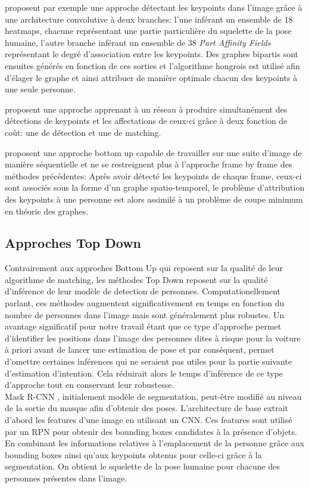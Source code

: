 \cite{cao2017realtime} proposent par exemple une approche détectant les keypoints dans l'image grâce à une architecture convolutive à deux branches: l'une inférant un ensemble de 18 heatmaps, chacune représentant une partie particulière du squelette de la pose humaine, l'autre branche inférant un ensemble de 38 \textit{Part Affinity Fields} représentant le degré d'association entre les keypoints. Des graphes bipartis sont ensuites générés en fonction de ces sorties et l'algorithme hongrois est utilisé afin d'élager le graphe et ainsi attribuer de manière optimale chacun des keypoints à une seule personne.

\cite{627f7b8a4a3441f28d400cfbd7a32b80} proposent une approche apprenant à un réseau à produire simultanément des détections de keypoints et les affectations de ceux-ci grâce à deux fonction de coût: une de détection et une de matching.

\cite{DBLP:journals/corr/InsafutdinovAPT16} proposent une approche bottom up capable de travailler sur une suite d'image de manière séquentielle et ne se restreignent plus à l'approche frame by frame des méthodes précédentes: Après avoir détecté les keypoints de chaque frame, ceux-ci sont associés sous la forme d'un graphe spatio-temporel, le problème d'attribution des keypoints à une personne est alors assimilé à un problème de coupe minimum en théorie des graphes.

\subsection{Approches Top Down}
Contrairement aux approches Bottom Up qui reposent sur la qualité de leur algorithme de matching, les méthodes Top Down reposent sur la qualité d'inférence de leur modèle de detection de personnes. Computationellement parlant, ces méthodes augmentent significativement en temps en fonction du nombre de personnes dans l'image mais sont généralement plus robustes. Un avantage significatif pour notre travail étant que ce type d'approche permet d'identifier les positions dans l'image des personnes dites à risque pour la voiture à priori avant de lancer une estimation de pose et par conséquent, permet d'omettre certaines inférences qui ne seraient pas utiles pour la partie suivante d'estimation d'intention. Cela réduirait alors le temps d'inférence de ce type d'approche tout en conservant leur robustesse.\\

Mask R-CNN \cite{2017arXiv170306870H}, initialement modèle de segmentation, peut-être modifié au niveau de la sortie du masque afin d'obtenir des poses. L'architecture de base extrait d'abord les features d'une image en utilisant un CNN. Ces features sont utilisé par un RPN pour obtenir des bounding boxes candidates à la présence d'objets. En combinant les informations relatives à l'emplacement de la personne grâce aux bounding boxes ainsi qu'aux keypoints obtenus pour celle-ci grâce à la segmentation. On obtient le squelette de la pose humaine pour chacune des personnes présentes dans l'image.



